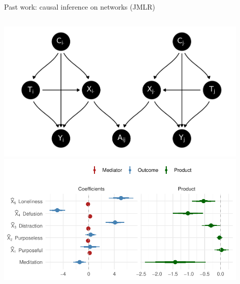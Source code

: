 \documentclass[aspectratio=169]{beamer}
\theoremstyle{remark}
\begin{document}
\begin{frame}{Past work: causal inference on networks (JMLR)}
    \vfill
    \begin{columns}
        \begin{column}{0.5\textwidth}
            \includegraphics[width=0.95\textwidth]{./figures/full_mediating.png}
            \vfill
            \includegraphics[width=0.95\textwidth]{./figures/coefficients.pdf}
        \end{column}
        \begin{column}{0.5\textwidth}
            \centering

\end{column}
\end{columns}
\end{frame}
\end{document}
